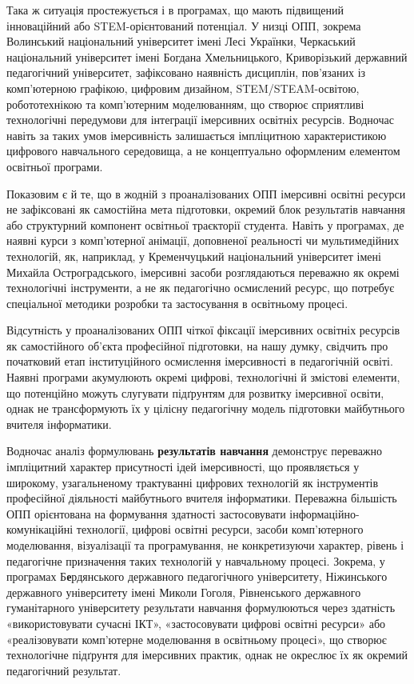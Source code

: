 Така ж ситуація простежується і в програмах, що мають підвищений інноваційний або STEM-орієнтований потенціал. У низці ОПП, зокрема Волинський національний університет імені Лесі Українки, Черкаський національний університет імені Богдана Хмельницького, Криворізький державний педагогічний університет, зафіксовано наявність дисциплін, пов'язаних із комп'ютерною графікою, цифровим дизайном, STEM/STEAM-освітою, робототехнікою та комп'ютерним моделюванням, що створює сприятливі технологічні передумови для інтеграції імерсивних освітніх ресурсів. Водночас навіть за таких умов імерсивність залишається імпліцитною характеристикою цифрового навчального середовища, а не концептуально оформленим елементом освітньої програми.

Показовим є й те, що в жодній з проаналізованих ОПП імерсивні освітні ресурси не зафіксовані як самостійна мета підготовки, окремий блок результатів навчання або структурний компонент освітньої траєкторії студента. Навіть у програмах, де наявні курси з комп'ютерної анімації, доповненої реальності чи мультимедійних технологій, як, наприклад, у Кременчуцький національний університет імені Михайла Остроградського, імерсивні засоби розглядаються переважно як окремі технологічні інструменти, а не як педагогічно осмислений ресурс, що потребує спеціальної методики розробки та застосування в освітньому процесі.

Відсутність у проаналізованих ОПП чіткої фіксації імерсивних освітніх ресурсів як самостійного об'єкта професійної підготовки, на нашу думку, свідчить про початковий етап інституційного осмислення імерсивності в педагогічній освіті. Наявні програми акумулюють окремі цифрові, технологічні й змістові елементи, що потенційно можуть слугувати підґрунтям для розвитку імерсивної освіти, однак не трансформують їх у цілісну педагогічну модель підготовки майбутнього вчителя інформатики.

Водночас аналіз формулювань \textbf{результатів навчання} демонструє переважно імпліцитний характер присутності ідей імерсивності, що проявляється у широкому, узагальненому трактуванні цифрових технологій як інструментів професійної діяльності майбутнього вчителя інформатики. Переважна більшість ОПП орієнтована на формування здатності застосовувати інформаційно-комунікаційні технології, цифрові освітні ресурси, засоби комп'ютерного моделювання, візуалізації та програмування, не конкретизуючи характер, рівень і педагогічне призначення таких технологій у навчальному процесі. Зокрема, у програмах Б\textbf{е}рдянського державного педагогічного університету, Ніжинського державного університету імені Миколи Гоголя, Рівненського державного гуманітарного університету результати навчання формулюються через здатність «використовувати сучасні ІКТ», «застосовувати цифрові освітні ресурси» або «реалізовувати комп'ютерне моделювання в освітньому процесі», що створює технологічне підґрунтя для імерсивних практик, однак не окреслює їх як окремий педагогічний результат.

